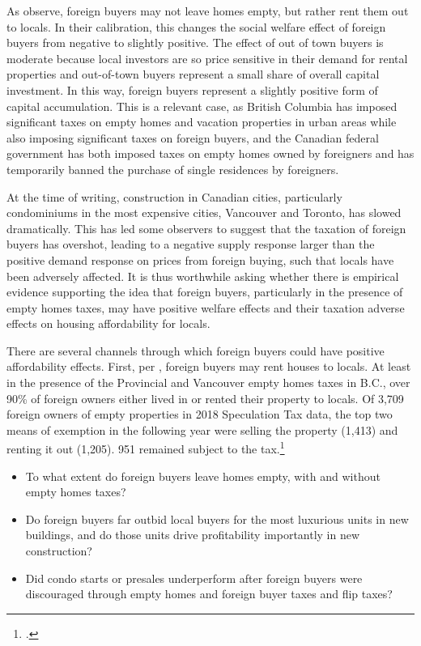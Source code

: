\documentclass[12pt]{article}
\begin{document}
As \textcite{favilukisVanNieuwerburgh} observe, foreign buyers may not leave
homes empty, but rather rent them out to locals. In their calibration, this
changes the social welfare effect of foreign buyers from negative to slightly
positive. The effect of out of town buyers is moderate because local investors
are so price sensitive in their demand for rental properties and out-of-town
buyers represent a small share of overall capital investment. In this way,
foreign buyers represent a slightly positive form of capital accumulation. This
is a relevant case, as British Columbia has imposed significant taxes on empty
homes and vacation properties in urban areas while also imposing significant
taxes on foreign buyers, and the Canadian federal government has both imposed
taxes on empty homes owned by foreigners and has temporarily banned the
purchase of single residences by foreigners.

At the time of writing, construction in Canadian cities, particularly
condominiums in the most expensive cities, Vancouver and Toronto, has slowed
dramatically. This has led some observers to suggest that the taxation of
foreign buyers has overshot, leading to a negative supply response larger than
the positive demand response on prices from foreign buying, such that locals
have been adversely affected. It is thus worthwhile asking whether there is
empirical evidence supporting the idea that foreign buyers, particularly in the
presence of empty homes taxes, may have positive welfare effects and their
taxation adverse effects on housing affordability for locals.

There are several channels through which foreign buyers could have positive
affordability effects. First, per \textcite{favilukisVanNieuwerburgh}, foreign
buyers may rent houses to locals. At least in the presence of the Provincial
and Vancouver empty homes taxes in B.C., over 90\% of foreign owners either
lived in or rented their property to locals. Of 3,709 foreign owners of empty
properties in 2018 Speculation Tax data, the top two means of exemption in the
following year were selling the property (1,413) and renting it out (1,205).
951 remained subject to the tax.\footnote{\textcite{specTax2019}.}

\begin{itemize}
	\item To what extent do foreign buyers leave homes empty, with and without empty homes taxes?
	\item Do foreign buyers far outbid local buyers for the most luxurious units in new buildings, and do those units drive profitability importantly in new construction?
	\item Did condo starts or presales underperform after foreign buyers were discouraged through empty homes and foreign buyer taxes and flip taxes?
\end{itemize}
\end{document}
